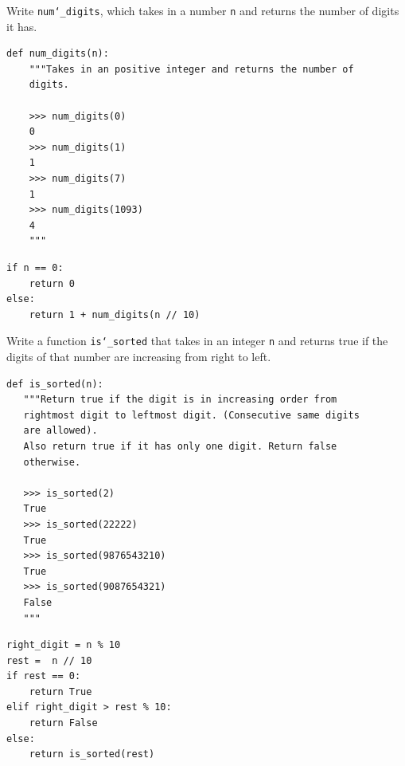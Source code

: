 \documentclass{exam}
\begin{document}
\begin{questions}


\begin{blocksection}
\question Write \texttt{num\char`_digits}, which takes in a number \texttt{n}
and returns the number of digits it has.

\begin{lstlisting}
def num_digits(n):
    """Takes in an positive integer and returns the number of
    digits.

    >>> num_digits(0)
    0
    >>> num_digits(1)
    1
    >>> num_digits(7)
    1
    >>> num_digits(1093)
    4
    """
\end{lstlisting}

\begin{solution}[1in]
\begin{lstlisting}
if n == 0:
    return 0
else:
    return 1 + num_digits(n // 10)
\end{lstlisting}
\end{solution}

\end{blocksection}


\begin{blocksection}
\question Write a function \texttt{is\char`_sorted} that takes in an integer
\texttt{n} and returns true if the digits of that number are increasing from
right to left.

\begin{lstlisting}
def is_sorted(n):
   """Return true if the digit is in increasing order from
   rightmost digit to leftmost digit. (Consecutive same digits
   are allowed).
   Also return true if it has only one digit. Return false
   otherwise.

   >>> is_sorted(2)
   True
   >>> is_sorted(22222)
   True
   >>> is_sorted(9876543210)
   True
   >>> is_sorted(9087654321)
   False
   """
\end{lstlisting}

\begin{solution}[1in]
\begin{lstlisting}
right_digit = n % 10
rest =  n // 10
if rest == 0:
    return True
elif right_digit > rest % 10:
    return False
else:
    return is_sorted(rest)
\end{lstlisting}
\end{solution}

\end{blocksection}


\end{questions}
\end{document}
